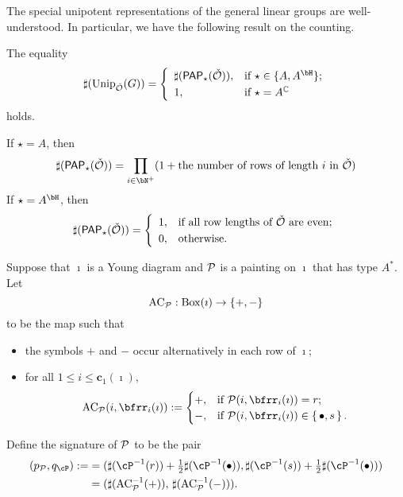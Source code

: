 \documentclass[counting_main.tex]{subfiles}
\begin{document}
The special unipotent representations of the general linear groups are
well-understood. In particular, we have the following result on the counting.
\begin{thm}
  The equality
  \[
    \sharp(\Unip_{\check \CO}(G))= \left\{
      \begin{array}{ll}
        \sharp(\PAP_\star(\check \CO)), &\hbox{if $\star\in\{A, A^\bH\}$}; \smallskip\\
        1, &\hbox{if $\star=A^\C$}  \end{array}
    \right.
  \]
  holds.

\end{thm}
\begin{remark}
  If $\star=A$, then
  \[
    \sharp(\PAP_\star(\check \CO))=\prod_{i\in \bN^+} (1+\textrm{the
      number of rows of length $i$ in $\check \CO$})
  \]
  If $\star=A^\bH$, then
  \[
    \sharp(\PAP_\star(\check \CO))= \left\{
      \begin{array}{ll}
        1, &\hbox{if all row lengths of $\check \CO$ are even}; \smallskip\\
        0, &\hbox{otherwise}.  \end{array}
    \right.
  \]

\end{remark}

Suppose that $\imath$ is a Young diagram and $\mathcal{P}$ is a painting on $\imath$
that has type $A^*$.
Let $$\mathrm{AC}_{\mathcal{P}}: \mathrm{Box}(\imath)\rightarrow \{+, -\}$$ to be the map
such that
\begin{itemize}
  \item the symbols $+$ and $-$ occur alternatively in each row of $\imath$;
  \item for all $1\leq i\leq \mathbf c_1(\imath) $,
        \[
        \mathrm{AC}_\CP (i,\bfrr_i(\imath)) := \begin{cases}
          +,  & \text{if  }\CP(i,\bfrr_i(\imath))=r;\\
          -, & \text{if } \CP(i,\bfrr_i(\imath))\in \set{\bullet,s}.
        \end{cases}
        \]
\end{itemize}
Define the signature of $\mathcal{P}$ to be the pair
\[
  \begin{split}
    (p_\CP, q_\cP):= &= (\sharp(\cP^{-1}(r))+\half \sharp(\cP^{-1}(\bullet)),\sharp(\cP^{-1}(s))
    + \half \sharp(\cP^{-1}(\bullet)))\\
    &=
    (\sharp( \mathrm{AC}_\CP^{-1}(+)),\, \sharp( \mathrm{AC}_\CP^{-1}(-))).\\
  \end{split}
\]
\end{document}

